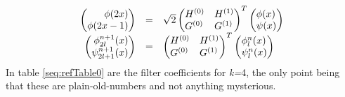 \documentclass[letterpaper]{book}
\begin{document}
\begin{equation}\label{seq:refText9}
\begin{matrix}\hfill \left(\begin{matrix}\hfill \phi (2x)\\\hfill \phi
(2x-1)\end{matrix}\right)&\text{=}&\sqrt{2}\left(\begin{matrix}H^{(0)}\hfill\null &H^{(1)}\hfill\null
\\G^{(0)}\hfill\null &G^{(1)}\hfill\null \end{matrix}\right)^{T}\left(\begin{matrix}\phi (x)\hfill\null \\\psi
(x)\hfill\null \end{matrix}\right)\hfill\null \\\hfill \left(\begin{matrix}\hfill \phi _{2l}^{n+1}(x)\\\hfill \psi
_{2l+1}^{n+1}(x)\end{matrix}\right)&\text{=}&\left(\begin{matrix}H^{(0)}\hfill\null &H^{(1)}\hfill\null
\\G^{(0)}\hfill\null &G^{(1)}\hfill\null \end{matrix}\right)^{T}\left(\begin{matrix}\phi _{l}^{n}(x)\hfill\null \\\psi
_{l}^{n}(x)\hfill\null \end{matrix}\right)\hfill\null \end{matrix}
\end{equation}
In table \ref{seq:refTable0} are the filter coefficients for \textit{k=}4, the only point being that these are
plain-old-numbers and not anything mysterious.
\end{document}
